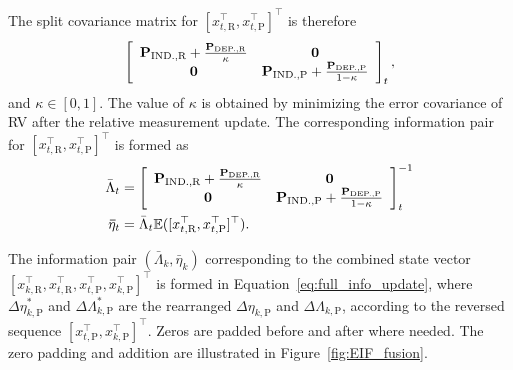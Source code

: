 The split covariance matrix for $[{x}_{t,\text{R}}^\top,{x}_{t,\text{P}}^\top]^\top$ is therefore 
\begin{equation}
\left[
   \begin{array}{cc}
              {\bf P}_\text{IND.,R}+\frac{{\bf P}_\text{DEP.,R}}{\kappa} &  \bf 0 \\
              \bf 0 & {\bf P}_\text{IND.,P}+\frac{{\bf P}_\text{DEP.,P}}{1-\kappa} \\
            \end{array}
          \right]_t, 
\end{equation}
and $\kappa\in[0,1]$. The value of $\kappa$ is obtained by minimizing the error covariance of RV after the relative measurement update. The corresponding information pair for $[{x}_{t,\text{R}}^\top,{x}_{t,\text{P}}^\top]^\top$ is formed as
           \begin{equation}
          \begin{split}
          \bar\Lambda_t&=\left[
            \begin{array}{cc}
              {\bf P}_\text{IND.,R}+\frac{{\bf P}_\text{DEP.,R}}{\kappa} &  \bf 0 \\
              \bf 0 & {\bf P}_\text{IND.,P}+\frac{{\bf P}_\text{DEP.,P}}{1-\kappa} \\
            \end{array}
          \right]_t^{-1} \\
          {\bf\bar\eta}_t&=\bar\Lambda_t\mathbb{E}([{x}_{t,\text{R}}^\top,{x}_{t,\text{P}}^\top]^\top). \\
          \end{split}
          \end{equation}

The information pair $({\bar\Lambda}_k,{\bar\eta}_k)$ corresponding to the combined state vector $[{x}_{k,\text{R}}^\top,{x}_{t,\text{R}}^\top,{x}_{t,\text{P}}^\top,{x}_{k,\text{P}}^\top]^\top$ is formed in Equation~\eqref{eq:full_info_update}, where $\Delta\eta^*_{k,\text{P}}$ and $\Delta\Lambda^*_{k,\text{P}}$ are the rearranged $\Delta\eta_{k,\text{P}}$ and $\Delta\Lambda_{k,\text{P}}$, according to the reversed sequence $[{x}_{t,\text{P}}^\top,{x}_{k,\text{P}}^\top]^\top$. Zeros are padded before and after where needed. The zero padding and addition are illustrated in Figure~\ref{fig:EIF_fusion}.

